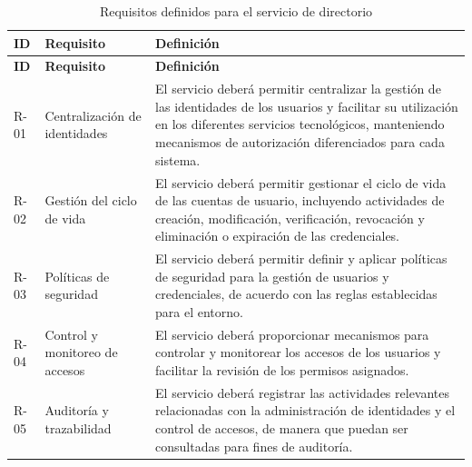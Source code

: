 \begingroup
\fontsize{8.5pt}{9.5pt}\selectfont
\renewcommand{\arraystretch}{1.3}
\setlength{\tabcolsep}{4pt}

\begin{longtable}{|
	>{\centering\arraybackslash}p{1.1cm}|
	>{\raggedright\arraybackslash}p{3.2cm}|
	>{\raggedright\arraybackslash}p{9.2cm}|}

	\caption{Requisitos definidos para el servicio de directorio}
	\label{tab:requisitos}
	\\
	\hline
	\textbf{ID}                         &
	\textbf{Requisito}                  &
	\textbf{Definición}
	\\
	\hline
	\endfirsthead

	\hline
	\textbf{ID}                         &
	\textbf{Requisito}                  &
	\textbf{Definición}
	\\
	\hline
	\endhead

	R-01                                &
	Centralización de identidades       &
	El servicio deberá permitir centralizar la gestión de las identidades de los usuarios y facilitar su utilización en los diferentes servicios tecnológicos, manteniendo mecanismos de autorización diferenciados para cada sistema.
	\\
	\hline

	R-02                                &
	Gestión del ciclo de vida           &
	El servicio deberá permitir gestionar el ciclo de vida de las cuentas de usuario, incluyendo actividades de creación, modificación, verificación, revocación y eliminación o expiración de las credenciales.
	\\
	\hline

	R-03                                &
	Políticas de seguridad              &
	El servicio deberá permitir definir y aplicar políticas de seguridad para la gestión de usuarios y credenciales, de acuerdo con las reglas establecidas para el entorno.
	\\
	\hline

	R-04                                &
	Control y monitoreo de accesos      &
	El servicio deberá proporcionar mecanismos para controlar y monitorear los accesos de los usuarios y facilitar la revisión de los permisos asignados.
	\\
	\hline

	R-05                                &
	Auditoría y trazabilidad            &
	El servicio deberá registrar las actividades relevantes relacionadas con la administración de identidades y el control de accesos, de manera que puedan ser consultadas para fines de auditoría.
	\\
	\hline


\end{longtable}
